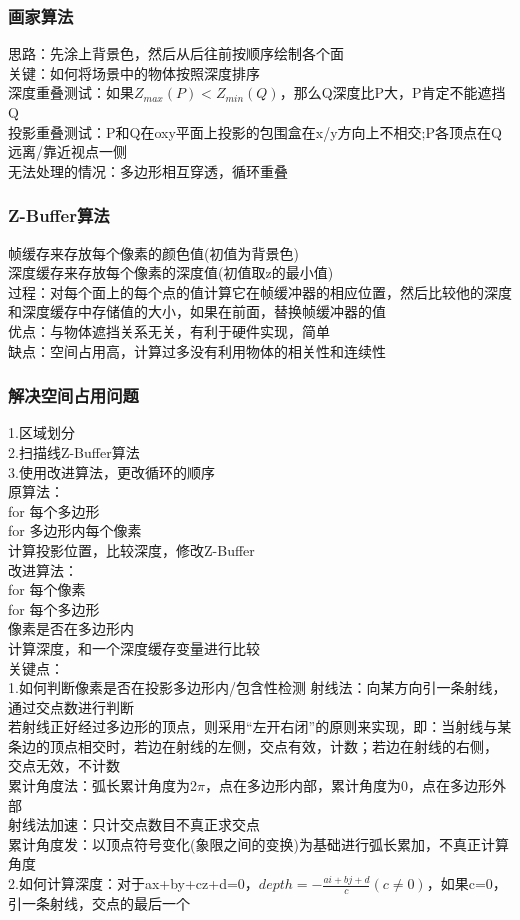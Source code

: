 \documentclass{article}
\begin{document}
\begin{CJK}{UTF8}{gbsn}
	\subsubsection{画家算法}
	思路：先涂上背景色，然后从后往前按顺序绘制各个面\\
	关键：如何将场景中的物体按照深度排序\\
	深度重叠测试：如果$Z_{max}(P)<Z_{min}(Q)$，那么Q深度比P大，P肯定不能遮挡Q\\
	投影重叠测试：P和Q在oxy平面上投影的包围盒在x/y方向上不相交;P各顶点在Q远离/靠近视点一侧\\
	无法处理的情况：多边形相互穿透，循环重叠\\
	\subsubsection{Z-Buffer算法}
	帧缓存来存放每个像素的颜色值(初值为背景色)\\
	深度缓存来存放每个像素的深度值(初值取z的最小值)\\
	过程：对每个面上的每个点的值计算它在帧缓冲器的相应位置，然后比较他的深度和深度缓存中存储值的大小，如果在前面，替换帧缓冲器的值\\
	优点：与物体遮挡关系无关，有利于硬件实现，简单\\
	缺点：空间占用高，计算过多没有利用物体的相关性和连续性\\
	\subsubsection{解决空间占用问题}
	1.区域划分\\
	2.扫描线Z-Buffer算法\\
	3.使用改进算法，更改循环的顺序\\
	原算法：\\
	for 每个多边形\\
	for 多边形内每个像素\\
	计算投影位置，比较深度，修改Z-Buffer\\
	改进算法：\\
	for 每个像素\\
	for 每个多边形\\
	像素是否在多边形内\\
	计算深度，和一个深度缓存变量进行比较\\
	关键点：\\
	1.如何判断像素是否在投影多边形内/包含性检测
	射线法：向某方向引一条射线，通过交点数进行判断\\
	若射线正好经过多边形的顶点，则采用“左开右闭”的原则来实现，即：当射线与某条边的顶点相交时，若边在射线的左侧，交点有效，计数；若边在射线的右侧， 交点无效，不计数\\
	累计角度法：弧长累计角度为2$\pi$，点在多边形内部，累计角度为0，点在多边形外部\\
	射线法加速：只计交点数目不真正求交点\\
	累计角度发：以顶点符号变化(象限之间的变换)为基础进行弧长累加，不真正计算角度\\
	2.如何计算深度：对于ax+by+cz+d=0，$depth=-\frac{ai+bj+d}{c}(c\neq 0)$，如果c=0，引一条射线，交点的最后一个\\

\end{CJK}
\end{document}
